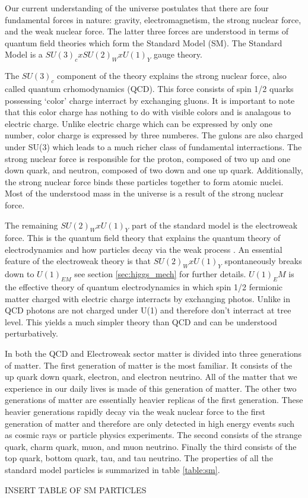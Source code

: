 
Our current understanding of the universe postulates that there are four fundamental forces in nature: gravity, electromagnetism, the strong nuclear force, and the weak nuclear force.
The latter three forces are understood in terms of quantum field theories which form the Standard Model (SM).
The Standard Model is a $SU(3)_cxSU(2)_WxU(1)_Y$ gauge theory.

The $SU(3)_c$ component of the theory explains the strong nuclear force, also called quantum crhomodynamics (QCD).
This force consists of spin 1/2 quarks possessing `color' charge interract by exchanging gluons.
It is important to note that this color charge has nothing to do with visible colors and is analagous to electric charge.
Unlike electric charge which can be expressed by only one number, color charge is expressed by three numberes.
The gulons are also charged under SU(3) which leads to a much richer class of fundamental interractions.
The strong nuclear force is responsible for the proton, composed of two up and one down quark, and neutron, composed of two down and one up quark.
Additionally, the strong nuclear force binds these particles together to form atomic nuclei.
Most of the understood mass in the universe is a result of the strong nuclear force.

The remaining $SU(2)_WxU(1)_Y$ part of the standard model is the electroweak force.
This is the quantum field theory that explains the quantum theory of electrodynamics and how particles decay via the weak process .
An essential feature of the electroweak theory is that $SU(2)_WxU(1)_Y$ spontaneously breaks down to $U(1)_{EM}$ see section \ref{sec:higgs_mech} for further details.
$U(1)_EM$ is the effective theory of quantum electrodynamics in which spin 1/2 fermionic matter charged with electric charge interracts by exchanging photos.
Unlike in QCD photons are not charged under U(1) and therefore don't interract at tree level.
This yields a much simpler theory than QCD and can be understood perturbatively.

In both the QCD and Electroweak sector matter is divided into three generations of matter.
The first generation of matter is the most familiar.
It consists of the up quark down quark, electron, and electron neutrino.
All of the matter that we experience in our daily lives is made of this generation of matter.
The other two generations of matter are essentially heavier replicas of the first generation.
These heavier generations rapidly decay via the weak nuclear force to the first generation of matter and therefore are only detected in high energy events such as cosmic rays or particle physics experiments.
The second consists of the strange quark, charm quark, muon, and muon neutrino.
Finally the third consists of the top quark, bottom quark, tau, and tau neutrino.
The properties of all the standard model particles is summarized in table \ref{table:sm}.

INSERT TABLE OF SM PARTICLES
